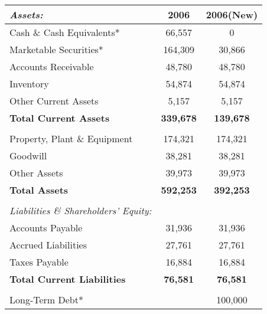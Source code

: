 \begin{table}[ht]
\centering
\begin{tabular}{lcc}
\toprule
\textit{Assets:}                              & 2006             & 2006(New)        \\  \midrule
Cash \& Cash Equivalents*                     & 66,557           & 0                \\
Marketable Securities*                        & 164,309          & 30,866           \\
Accounts Receivable                           & 48,780           & 48,780           \\
Inventory                                     & 54,874           & 54,874           \\
Other Current Assets                          & 5,157            & 5,157            \\
\textbf{Total Current Assets}                 & \textbf{339,678} & \textbf{139,678} \\
                                              &                  &                  \\
Property, Plant \& Equipment                  & 174,321          & 174,321          \\
Goodwill                                      & 38,281           & 38,281           \\
Other Assets                                  & 39,973           & 39,973           \\
\textbf{Total Assets}                         & \textbf{592,253} & \textbf{392,253} \\
                                              &                  &                  \\
\textit{Liabilities \& Shareholders' Equity:} &                  &                  \\
Accounts Payable                              & 31,936           & 31,936           \\
Accrued Liabilities                           & 27,761           & 27,761           \\
Taxes Payable                                 & 16,884           & 16,884           \\
\textbf{Total Current Liabilities}            & \textbf{76,581}  & \textbf{76,581}  \\
                                              &                  &                  \\
Long-Term Debt*                               &                  & 100,000          \\

\end{tabular}
\end{table}
